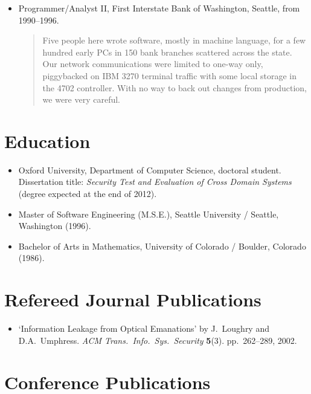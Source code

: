 \documentclass[letterpaper]{article}
\begin{document}
\begin{itemize}
	\item Programmer/Analyst II, First Interstate Bank of Washington, Seattle, from 1990--1996.

		\begin{quote}\vspace{-2mm}
			Five people here wrote software, mostly in machine language, for a few hundred early
			PCs in 150 bank branches scattered across the state.  Our network communications were
			limited to one-way only, piggybacked on IBM 3270 terminal traffic with some local
			storage in the 4702 controller.  With no way to back out changes from production,
			we were very careful.
		\end{quote}

\end{itemize}

\section*{Education} %

\begin{itemize}
    \item Oxford University, Department of Computer Science,
		doctoral student.  Dissertation title: \emph{Security Test and Evaluation
		of Cross Domain Systems} (degree expected at the end of 2012).

    \item Master of Software Engineering (M.S.E.), Seattle
		University / Seattle, Washington (1996).

    \item Bachelor of Arts in Mathematics, University of
		Colorado / Boulder, Colorado (1986).
\end{itemize}

\section*{Refereed Journal Publications} %

\begin{itemize}
    \item `Information Leakage from Optical Emanations' by J.\ Loughry
    and D.A.\ Umphress. \emph{ACM Trans.\ Info.\ Sys.\ Security} \textbf{5}(3).
    pp.\ 262--289, 2002.
\end{itemize}

\section*{Conference Publications} %
\end{document}
